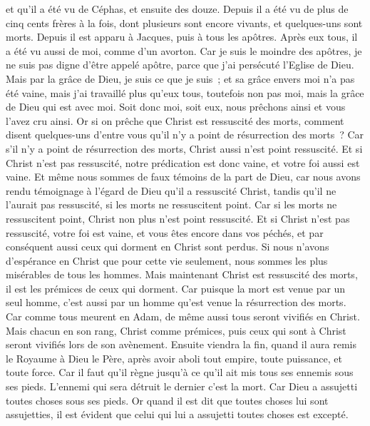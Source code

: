 \begin{multicols}{2}
et qu'il a été vu de Céphas, et ensuite des douze.
Depuis il a été vu de plus de cinq cents frères à la fois, dont plusieurs sont encore vivants, et quelques-uns sont morts.
Depuis il est apparu à Jacques, puis à tous les apôtres.
Après eux tous, il a été vu aussi de moi, comme d'un avorton.
Car je suis le moindre des apôtres, je ne suis pas digne d'être appelé apôtre, parce que j'ai persécuté l'Eglise de Dieu.
Mais par la grâce de Dieu, je suis ce que je suis~; et sa grâce envers moi n'a pas été vaine, mais j'ai travaillé plus qu'eux tous, toutefois non pas moi, mais la grâce de Dieu qui est avec moi.
Soit donc moi, soit eux, nous prêchons ainsi et vous l'avez cru ainsi.
Or si on prêche que Christ est ressuscité des morts, comment disent quelques-uns d'entre vous qu'il n'y a point de résurrection des morts~?
Car s'il n'y a point de résurrection des morts, Christ aussi n'est point ressuscité.
Et si Christ n'est pas ressuscité, notre prédication est donc vaine, et votre foi aussi est vaine.
Et même nous sommes de faux témoins de la part de Dieu, car nous avons rendu témoignage à l'égard de Dieu qu'il a ressuscité Christ, tandis qu'il ne l'aurait pas ressuscité, si les morts ne ressuscitent point.
Car si les morts ne ressuscitent point, Christ non plus n'est point ressuscité.
Et si Christ n'est pas ressuscité, votre foi est vaine, et vous êtes encore dans vos péchés,
et par conséquent aussi ceux qui dorment en Christ sont perdus.
Si nous n'avons d'espérance en Christ que pour cette vie seulement, nous sommes les plus misérables de tous les hommes.
Mais maintenant Christ est ressuscité des morts, il est les prémices de ceux qui dorment.
Car puisque la mort est venue par un seul homme, c'est aussi par un homme qu'est venue la résurrection des morts.
Car comme tous meurent en Adam, de même aussi tous seront vivifiés en Christ.
Mais chacun en son rang, Christ comme prémices, puis ceux qui sont à Christ seront vivifiés lors de son avènement.
Ensuite viendra la fin, quand il aura remis le Royaume à Dieu le Père, après avoir aboli tout empire, toute puissance, et toute force.
Car il faut qu'il règne jusqu'à ce qu'il ait mis tous ses ennemis sous ses pieds.
L'ennemi qui sera détruit le dernier c'est la mort.
Car Dieu a assujetti toutes choses sous ses pieds. Or quand il est dit que toutes choses lui sont assujetties, il est évident que celui qui lui a assujetti toutes choses est excepté.

\end{multicols}
